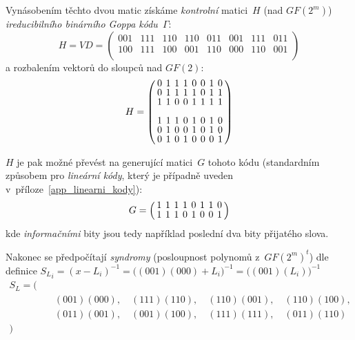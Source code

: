 \documentclass[thesis=M,czech,hidelinks]{FITthesis}[2012/06/26]
\newcommand{\0}{{\textcolor[gray]{0.75}{0}}}
\begin{document}
\newpage

Vynásobením těchto dvou matic získáme \emph{kontrolní} matici~$H$ (nad
$GF(2^m)$) \emph{ireducibilního binárního Goppa kódu}~$\Gamma$:
$$
    H = VD = \left(
        \begin{array}{*{8}{c}}
            001 & 111 & 110 & 110 & 011 & 001 & 111 & 011 \\
            100 & 111 & 100 & 001 & 110 & 000 & 110 & 001 \\
        \end{array}
    \right)
$$
a rozbalením vektorů do sloupců nad $GF(2)$:
$$
\arraycolsep=2pt
\def\arraystretch{0.8}
    H = \left(
        \begin{array}{*{8}{c}}
            0   & 1   & 1   & 1   & 0   & 0   & 1   & 0   \\
             0  &  1  &  1  &  1  &  1  &  0  &  1  &  1  \\
              1 &   1 &   0 &   0 &   1 &   1 &   1 &   1 \\
            \\
            1   & 1   & 1   & 0   & 1   & 0   & 1   & 0   \\
             0  &  1  &  0  &  0  &  1  &  0  &  1  &  0  \\
              0 &   1 &   0 &   1 &   0 &   0 &   0 &   1 \\
        \end{array}
    \right)
$$

$H$ je pak možné převést na generující matici~$G$ tohoto kódu (standardním
způsobem pro \emph{lineární kódy}, který je případně uveden
v~příloze~\ref{app_linearni_kody}):
$$
\arraycolsep=2pt
\def\arraystretch{0.8}
    G = \left(
        \begin{array}{*{8}{c}}
            1 & 1 & 1 & 1 & 0 & 1 & 1 & 0 \\
            1 & 1 & 1 & 0 & 1 & 0 & 0 & 1 \\
        \end{array}
    \right)
$$
kde \emph{informačními} bity jsou tedy například poslední dva bity přijatého
slova.

Nakonec se předpočítají \emph{syndromy} (posloupnost polynomů z~$GF(2^m)^t$) dle
definice ${S_L}_i = (x-L_i)^{-1} = \Big( (001)(000) + L_i \Big)^{-1} =
\Big((001)(L_i)\Big)^{-1}$
\begin{align*}
    S_L = \big( & \\
                & \quad (001)(000), \quad (111)(110), \quad (110)(001), \quad (110)(100), \\
                & \quad (011)(001), \quad (001)(100), \quad (111)(111), \quad (011)(110)  \\
    \big)       &
\end{align*}
\end{document}
